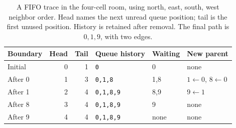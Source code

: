 \begin{table}[htbp]
  \centering
  \small
  \begin{tabular}{lrrlll}
    \toprule
    Boundary & Head & Tail & Queue history    & Waiting & New parent           \\
    \midrule
    Initial  & 0    & 1    & \texttt{0}       & 0       & none                 \\
    After 0  & 1    & 3    & \texttt{0,1,8}   & 1,8     & $1\gets0$, $8\gets0$ \\
    After 1  & 2    & 4    & \texttt{0,1,8,9} & 8,9     & $9\gets1$            \\
    After 8  & 3    & 4    & \texttt{0,1,8,9} & 9       & none                 \\
    After 9  & 4    & 4    & \texttt{0,1,8,9} & none    & none                 \\
    \bottomrule
  \end{tabular}
  \caption{A FIFO trace in the four-cell room, using north, east, south, west neighbor order. Head names the next unread queue position; tail is the first unused position. History is retained after removal. The final path is $0,1,9$, with two edges.}
  \label{tab:revision-maze-frontier}
\end{table}
